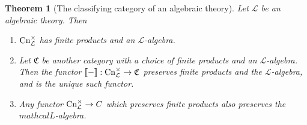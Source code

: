 \documentclass[12pt,twoside]{reedthesis}
\theoremstyle{definition}
\theoremstyle{remark}
\theoremstyle{plain}
\newtheorem{theorem}{Theorem}
\begin{document}
\begin{theorem}[The classifying category of an algebraic
  theory]\label{thm:classifying alg theory} Let \( \mathcal{L} \) be an
  algebraic theory. Then \begin{enumerate}
    \item $\mathrm{Cn}_{\mathcal{L}}^{\times}$ has finite products and an $\mathcal{L}$-algebra.
    \item Let $\mathfrak{C}$ be another category with a choice of finite
    products and an $\mathcal{L}$-algebra. Then the functor $\llbracket-\rrbracket :
    \mathrm{Cn}_{\mathcal{L}}^{\times} \rightarrow \mathfrak{C}$ preserves finite
    products and the $\mathcal{L}$-algebra, and is the unique such functor.
    \item Any functor \( \mathrm{Cn}_{\mathcal{L}}^{\times} \rightarrow C \) which
    preserves finite products also preserves the $mathcal{L}$-algebra.
  \end{enumerate}
\end{theorem}
\end{document}
